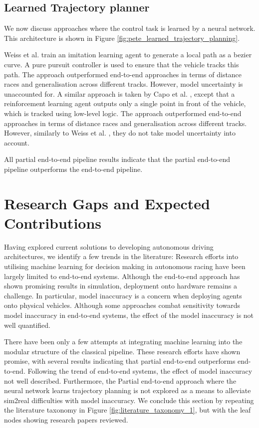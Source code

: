 \subsection{Learned Trajectory planner}
\label{sec:learned_planner}
We now discuss approaches where the control task is learned by a neural network. This architecture is shown in Figure \ref{fig:pete_learned_trajectory_planning}.

Weiss et al. \cite{Weiss2020a} train an imitation learning agent to generate a local path as a bezier curve.
A pure pursuit controller is used to ensure that the vehicle tracks this path.
The approach outperformed end-to-end approaches in terms of distance races and generalisation across different tracks.
However, model uncertainty is unaccounted for.
A similar approach is taken by Capo et al. \cite{Capo2020}, except that a reinforcement learning agent outputs only a single point in front of the vehicle, which is tracked using low-level logic.
The approach outperformed end-to-end approaches in terms of distance races and generalisation across different tracks. However, similarly to Weiss et al. \cite{Weiss2020}, they do not take model uncertainty into account.


All partial end-to-end pipeline results indicate that the partial end-to-end pipeline outperforms the end-to-end pipeline.



\section{Research Gaps and Expected Contributions}
\label{research_gap}
Having explored current solutions to developing autonomous driving architectures, we identify a few trends in the literature:
Research efforts into utilising machine learning for decision making in autonomous racing have been largely limited to end-to-end systems. 
Although the end-to-end approach has shown promising results in simulation, deployment onto hardware remains a challenge.
In particular, model inaccuracy is a concern when deploying agents onto physical vehicles.
Although some approaches combat sensitivity towards model inaccuracy in end-to-end systems, the effect of the model inaccuracy is not well quantified.

There have been only a few attempts at integrating machine learning into the modular structure of the classical pipeline.
These research efforts have shown promise, with several results indicating that partial end-to-end outperforms end-to-end.
Following the trend of end-to-end systems, the effect of model inaccuracy not well described.
Furthermore, the Partial end-to-end approach where the neural network learns trajectory planning is not explored as a means to alleviate sim2real difficulties with model inaccuracy.
We conclude this section by repeating the literature taxonomy in Figure \ref{fig:literature_taxonomy_1}, but with the leaf nodes showing research papers reviewed.

